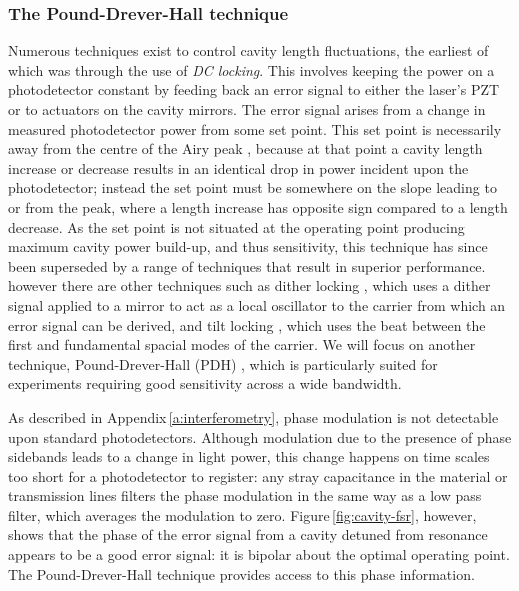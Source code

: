\subsubsection{\label{sec:pdh}The Pound-Drever-Hall technique}

Numerous techniques exist to control cavity length fluctuations, the earliest of which was through the use of \emph{DC locking}. This involves keeping the power on a photodetector constant by feeding back an error signal to either the laser's \gls{PZT} or to actuators on the cavity mirrors. The error signal arises from a change in measured photodetector power from some set point. This set point is necessarily away from the centre of the Airy peak , because at that point a cavity length increase or decrease results in an identical drop in power incident upon the photodetector; instead the set point must be somewhere on the slope leading to or from the peak, where a length increase has opposite sign compared to a length decrease. As the set point is not situated at the operating point producing maximum cavity power build-up, and thus sensitivity, this technique has since been superseded by a range of techniques that result in superior performance. however there are other techniques such as dither locking \cite{White1965}, which uses a dither signal applied to a mirror to act as a local oscillator to the carrier from which an error signal can be derived, and tilt locking \cite{Shaddock1999}, which uses the beat between the first and fundamental spacial modes of the carrier. We will focus on another technique, Pound-Drever-Hall (\gls{PDH}) \cite{Drever1983, Black2001}, which is particularly suited for \FP{} experiments requiring good sensitivity across a wide bandwidth.

As described in Appendix\,\ref{a:interferometry}, phase modulation is not detectable upon standard photodetectors. Although modulation due to the presence of phase sidebands leads to a change in light power, this change happens on time scales too short for a photodetector to register: any stray capacitance in the material or transmission lines filters the phase modulation in the same way as a low pass filter, which averages the modulation to zero. Figure\,\ref{fig:cavity-fsr}, however, shows that the phase of the error signal from a cavity detuned from resonance appears to be a good error signal: it is bipolar about the optimal operating point. The Pound-Drever-Hall technique provides access to this phase information.

